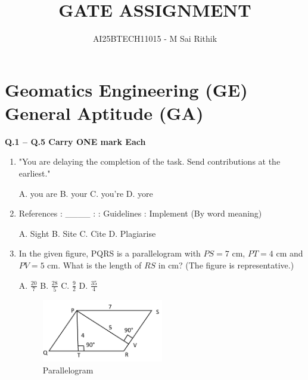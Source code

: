 \documentclass[journal,12pt,onecolumn]{IEEEtran}
\begin{document}
\title{
GATE ASSIGNMENT}
\author{AI25BTECH11015 - M Sai Rithik}
\maketitle


\section*{Geomatics Engineering (GE) \\ General Aptitude (GA)}

\textbf{Q.1 -- Q.5 Carry ONE mark Each}



\begin{enumerate}
    \item "You are delaying the completion of the task. Send \underline{\hspace{2cm}} contributions at the earliest."

    A. you are \quad
    B. your \quad
    C. you're \quad
    D. yore

    \item References : \_\_\_\_ : : Guidelines : Implement (By word meaning)

    A. Sight \quad
    B. Site \quad
    C. Cite \quad
    D. Plagiarise

    \item In the given figure, PQRS is a parallelogram with $PS=7$ cm, $PT=4$ cm and $PV=5$ cm. What is the length of $RS$ in cm? (The figure is representative.)

    A. $\frac{20}{7}$ \quad
    B. $\frac{28}{5}$ \quad
    C. $\frac{9}{2}$ \quad
    D. $\frac{35}{4}$

    \begin{figure}[h] 
    \centering
    \includegraphics[width=0.5\textwidth]{figs/qn3.png}
    \caption{Parallelogram}
\label{fig:q3 graph}
\end{figure}



\begin{center}

\end{center}


\end{enumerate}
\end{document}
